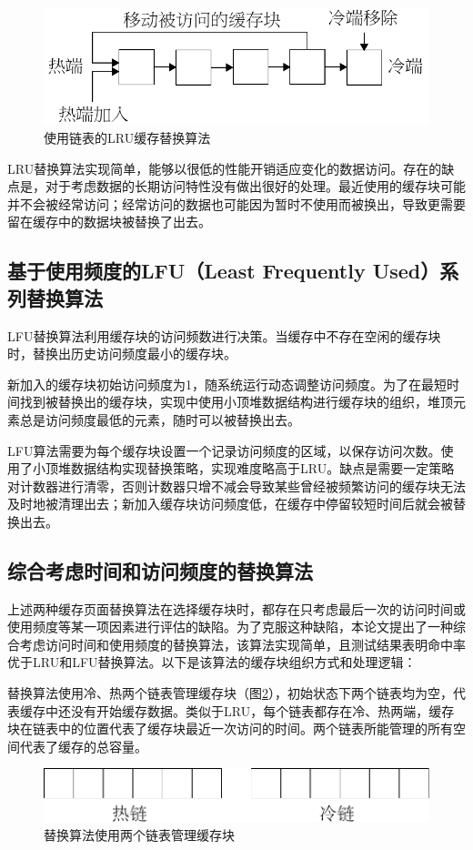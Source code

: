 \begin{figure}[H]
\centering
\includegraphics[width=0.6\linewidth]{./graph/replace-algo-lru}
\caption{使用链表的LRU缓存替换算法}
\label{fig:replace-algo-lru}
\end{figure}

LRU替换算法实现简单，能够以很低的性能开销适应变化的数据访问。存在的缺点是，对于考虑数据的长期访问特性没有做出很好的处理。最近使用的缓存块可能并不会被经常访问；经常访问的数据也可能因为暂时不使用而被换出，导致更需要留在缓存中的数据块被替换了出去。

\subsection{基于使用频度的LFU（Least Frequently Used）系列替换算法}

LFU替换算法\cite{LFU}利用缓存块的访问频数进行决策。当缓存中不存在空闲的缓存块时，替换出历史访问频度最小的缓存块。

新加入的缓存块初始访问频度为1，随系统运行动态调整访问频度。为了在最短时间找到被替换出的缓存块，实现中使用小顶堆数据结构进行缓存块的组织，堆顶元素总是访问频度最低的元素，随时可以被替换出去。

LFU算法需要为每个缓存块设置一个记录访问频度的区域，以保存访问次数。使用了小顶堆数据结构实现替换策略，实现难度略高于LRU。缺点是需要一定策略对计数器进行清零，否则计数器只增不减会导致某些曾经被频繁访问的缓存块无法及时地被清理出去；新加入缓存块访问频度低，在缓存中停留较短时间后就会被替换出去。

\subsection{综合考虑时间和访问频度的替换算法}

上述两种缓存页面替换算法在选择缓存块时，都存在只考虑最后一次的访问时间或使用频度等某一项因素进行评估的缺陷。为了克服这种缺陷，本论文提出了一种综合考虑访问时间和使用频度的替换算法，该算法实现简单，且测试结果表明命中率优于LRU和LFU替换算法。以下是该算法的缓存块组织方式和处理逻辑：

替换算法使用冷、热两个链表管理缓存块（图\ref{fig:replace-algo-1}），初始状态下两个链表均为空，代表缓存中还没有开始缓存数据。类似于LRU，每个链表都存在冷、热两端，缓存块在链表中的位置代表了缓存块最近一次访问的时间。两个链表所能管理的所有空间代表了缓存的总容量。
\begin{figure}[H]
\centering
\includegraphics[width=0.6\linewidth]{./graph/replace-algo-1}
\caption{替换算法使用两个链表管理缓存块}
\label{fig:replace-algo-1}
\end{figure}

